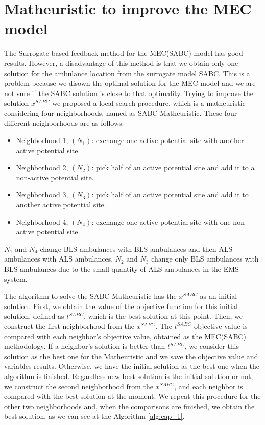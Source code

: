 \section{Matheuristic to improve the MEC model}
The Surrogate-based feedback method for the MEC(SABC) model has good results. However, a disadvantage of this method is that we obtain only one solution for the ambulance location from the surrogate model SABC. This is a problem because we disown the optimal solution for the MEC model and we are not sure if the SABC solution is close to that optimality. Trying to improve the solution $x^{SABC}$ we proposed a local search procedure, which is a matheuristic considering four neighborhoods, named as SABC Matheuristic. These four different neighborhoods are as follows:
\begin{itemize}
 \item Neighborhood 1, $(N_1)$: exchange one active potential site with another active potential site.
\item Neighborhood 2, $(N_2)$: pick half of an active potential site and add it to a non-active potential site.
\item Neighborhood 3, $(N_3)$: pick half of an active potential site and add it to another active potential site.
\item Neighborhood 4, $(N_4)$: exchange one active potential site with one non-active potential site.
\end{itemize}

$N_1$ and $N_4$ change BLS ambulances with BLS ambulances and then ALS ambulances with ALS ambulances. $N_2$ and $N_3$ change only BLS ambulances with BLS ambulances due to the small quantity of ALS ambulances in the EMS system.

The algorithm to solve the SABC Matheuristic has the $x^{SABC}$ as an initial solution. First, we obtain the value of the objective function for this initial solution, defined as $t^{SABC}$, which is the best solution at this point. Then, we construct the first neighborhood from the $x^{SABC}$. The $t^{SABC}$ objective value is compared with each neighbor's objective value, obtained as the MEC(SABC) methodology. If a neighbor's solution is better than $t^{SABC}$, we consider this solution as the best one for the Matheuristic and we save the objective value and variables results. Otherwise, we have the initial solution as the best one when the algorithm is finished. Regardless new best solution is the initial solution or not, we construct the second neighborhood from the $x^{SABC}$, and each neighbor is compared with the best solution at the moment. We repeat this procedure for the other two neighborhoods and, when the comparisons are finished, we obtain the best solution, as we can see at the Algorithm \ref{alg:cap_1}.

